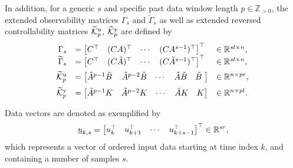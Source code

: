 In addition, for a generic $s$ and specific past data window length $p\in\mathbb{Z}_{>0}$, the extended observability matrices $\Gamma_s$ and $\widetilde{\Gamma}_s$ as well as extended reversed controllability matrices $\widetilde{\mathcal{K}}_{p}^{\mathrm{{u}}}$, $\widetilde{\mathcal{K}}_{p}^{\mathrm{{y}}}$ are defined by
$$\begin{array}{rll}
\Gamma_s &= \begin{bmatrix}C^\top & (CA)^\top & \cdots & (CA^{s-1})^\top\end{bmatrix}^\top&\in\mathbb{R}^{sl\times n},\\
\widetilde{\Gamma}_s &= \begin{bmatrix}C^\top & (C\tilde{A})^\top & \cdots & (C\tilde{A}^{s-1})^\top\end{bmatrix}^\top&\in\mathbb{R}^{sl\times n},\\
\tKp{u} &= \begin{bmatrix} \tilde{A}^{p-1}\tilde{B}\, & \tilde{A}^{p-2}\tilde{B} & \cdots & \tilde{A}\tilde{B} & \tilde{B}\,\,\end{bmatrix}&\in\mathbb{R}^{n\times pr},\vphantom{\bigg|}\\%
\tKp{y} &= \begin{bmatrix} \tilde{A}^{p-1}K & \tilde{A}^{p-2}K & \cdots & \tilde{A}K & K \end{bmatrix}&\in\mathbb{R}^{n\times pl}.
\end{array}$$

Data vectors are denoted as exemplified by
\begin{align*}
    \underline{u}_{k,s} = \begin{bmatrix} u_k^\top & u_{k+1}^\top & \cdots & u_{k+s-1}^\top\end{bmatrix}^\top\in\mathbb{R}^{sr},
\end{align*}
which represents a vector of ordered input data starting at time index $k$, and containing a number of samples $s$.


